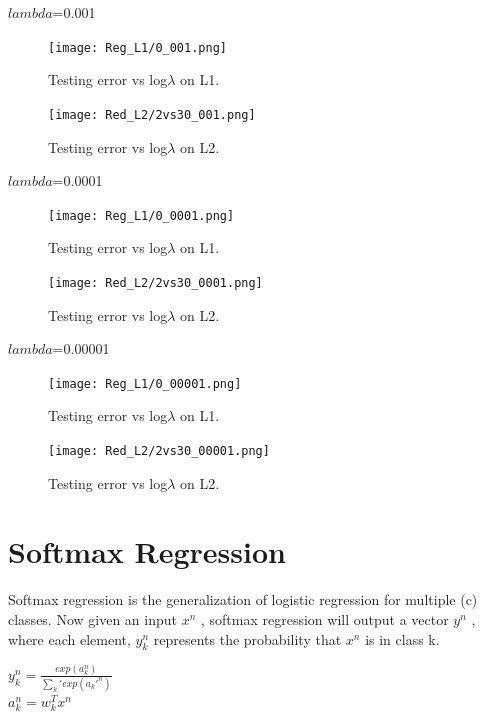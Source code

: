\documentclass{article} %
\begin{document}
$lambda$=0.001

\begin{figure}[h]
\begin{center}
\texttt{[image: Reg\_L1/0\_001.png]}
\end{center}
\caption{Testing error vs log$\lambda$ on L1.}
\end{figure}

\begin{figure}[h]
\begin{center}
\texttt{[image: Red\_L2/2vs30\_001.png]}
\end{center}
\caption{Testing error vs log$\lambda$ on L2.}
\end{figure}

$lambda$=0.0001

\begin{figure}[h]
\begin{center}
\texttt{[image: Reg\_L1/0\_0001.png]}
\end{center}
\caption{Testing error vs log$\lambda$ on L1.}
\end{figure}

\begin{figure}[h]
\begin{center}
\texttt{[image: Red\_L2/2vs30\_0001.png]}
\end{center}
\caption{Testing error vs log$\lambda$ on L2.}
\end{figure}

$lambda$=0.00001

\begin{figure}[h]
\begin{center}
\texttt{[image: Reg\_L1/0\_00001.png]}
\end{center}
\caption{Testing error vs log$\lambda$ on L1.}
\end{figure}

\begin{figure}[h]
\begin{center}
\texttt{[image: Red\_L2/2vs30\_00001.png]}
\end{center}
\caption{Testing error vs log$\lambda$ on L2.}
\end{figure}


\section{Softmax Regression}
Softmax regression is the generalization of logistic regression for multiple (c) classes. Now given an input $x^n$ , softmax regression will output a vector $y^n$ , where each element, $y_k^n$ represents the probability that $x^n$ is in class k.\\
\begin{center}
$y_k^n = \frac{exp(a_{k}^n)}{\sum_k' exp(a_k'^n)}$\\
$a_{k}^n = w_k^T x^n$\\
\end{center}
\end{document}
